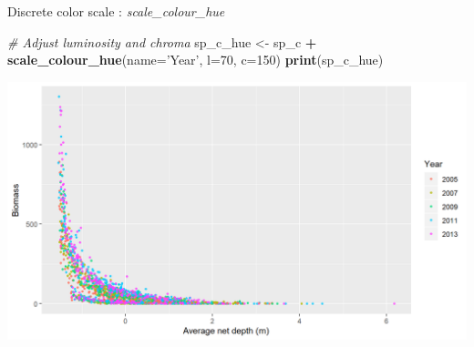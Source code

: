 \documentclass[
  ignorenonframetext,
]{beamer}
\newenvironment{Shaded}{\begin{snugshade}}{\end{snugshade}}
\newcommand{\CommentTok}[1]{\textcolor[rgb]{0.56,0.35,0.01}{\textit{#1}}}
\newcommand{\DataTypeTok}[1]{\textcolor[rgb]{0.13,0.29,0.53}{#1}}
\newcommand{\DecValTok}[1]{\textcolor[rgb]{0.00,0.00,0.81}{#1}}
\newcommand{\KeywordTok}[1]{\textcolor[rgb]{0.13,0.29,0.53}{\textbf{#1}}}
\newcommand{\NormalTok}[1]{#1}
\newcommand{\OperatorTok}[1]{\textcolor[rgb]{0.81,0.36,0.00}{\textbf{#1}}}
\newcommand{\StringTok}[1]{\textcolor[rgb]{0.31,0.60,0.02}{#1}}
\begin{document}
\begin{frame}[fragile]{Discrete color scale : \emph{scale\_colour\_hue}}
\protect\hypertarget{discrete-color-scale-scale_colour_hue}{}

\begin{Shaded}
\begin{Highlighting}[]
\CommentTok{# Adjust luminosity and chroma}
\NormalTok{sp_c_hue <-}\StringTok{ }\NormalTok{sp_c }\OperatorTok{+}
\StringTok{  }\KeywordTok{scale_colour_hue}\NormalTok{(}\DataTypeTok{name=}\StringTok{'Year'}\NormalTok{, }\DataTypeTok{l=}\DecValTok{70}\NormalTok{, }\DataTypeTok{c=}\DecValTok{150}\NormalTok{)}
\KeywordTok{print}\NormalTok{(sp_c_hue)}
\end{Highlighting}
\end{Shaded}

\begin{center}\includegraphics[width=0.8\linewidth]{figure/sp_discrete_color_hue1-1} \end{center}

\end{frame}
\end{document}
